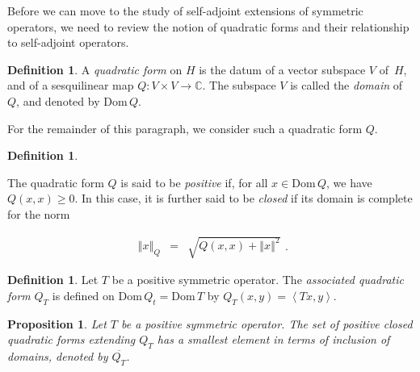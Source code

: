 \documentclass{jams-l}
\newtheorem{proposition}[theorem]{Proposition}
\theoremstyle{definition}
\newtheorem{definition}[theorem]{Definition}
\theoremstyle{remark}
\numberwithin{equation}{section}
\begin{document}
        Before we can move to the study of self-adjoint extensions of symmetric operators, we need to review the notion of quadratic forms and their relationship to self-adjoint operators.
    
        \begin{definition}
    
            A \textit{quadratic form} on $H$ is the datum of a vector subspace $V$ of~$H$, and of a sesquilinear map $Q : V \times V \longrightarrow \mathbb{C}$. The subspace $V$ is called the \textit{domain} of $Q$, and denoted by $\mathrm{Dom} \, Q$.
    
        \end{definition}
        
        For the remainder of this paragraph, we consider such a quadratic form $Q$.
        
        \begin{definition}
        \label{DefQuadFormNorm}
        
            The quadratic form $Q$ is said to be \textit{positive} if, for all $x \in \mathrm{Dom} \, Q$, we have $Q \left( x, x \right) \geqslant 0$. In this case, it is further said to be \textit{closed} if its domain is complete for the norm
            
            \[ \begin{array}{lll}
                    \left \Vert x \right \Vert_Q & = & \sqrt{Q \left( x,x \right) + \left \Vert x \right \Vert^2}
                \end{array} . \]
        
        \end{definition}
        
        \begin{definition}
        
            Let $T$ be a positive symmetric operator. The \textit{associated quadratic form} $Q_T$ is defined on $\mathrm{Dom} \, Q_t = \mathrm{Dom} \, T$ by $Q_T \left( x,y \right) = \left< Tx, y \right>$.
        
        \end{definition}
        
        \begin{proposition}
        
            Let $T$ be a positive symmetric operator. The set of positive closed quadratic forms extending $Q_T$ has a smallest element in terms of inclusion of domains, denoted by $\overline{Q_T}$.
        
        \end{proposition}
        
\end{document}
